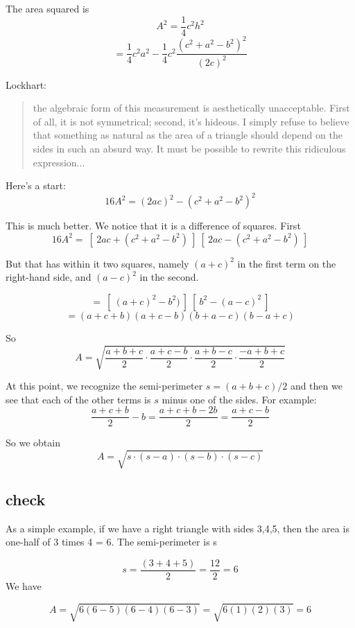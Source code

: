 \documentclass[11pt, oneside]{article}
\begin{document}
The area squared is
\[ A^2 = \frac{1}{4}c^2 h^2 \]
\[ = \frac{1}{4} c^2 a^2 - \frac{1}{4} c^2 \frac{(c^2 + a^2-b^2)^2}{(2c)^2}  \]

Lockhart:

\begin{quote}
the algebraic form of this measurement is aesthetically unacceptable. First of all, it is not symmetrical; second, it's hideous. I simply refuse to believe that something as natural as the area of a triangle should depend on the sides in such an absurd way. It must be possible to rewrite this ridiculous expression...
\end{quote}

Here's a start:
\[ 16A^2 = (2ac)^2 - (c^2 + a^2-b^2)^2 \]

This is much better.  We notice that it is a difference of squares.  First
\[ 16A^2 = \ [ \ 2ac + (c^2 + a^2-b^2) \ ] \ [ \ 2ac - (c^2 + a^2-b^2) \ ]  \]

But that has within it two squares, namely $(a + c)^2$ in the first term on the right-hand side, and $(a - c)^2$ in the second.

\[ = \ [ \ (a + c)^2 -b^2) \ ] \ [ \ b^2 - (a - c)^2 \ ]  \]
\[ =  (a + c + b)(a + c - b)(b + a - c)(b - a + c) \]

So
\[ A = \sqrt{\frac{a + b + c}{2}  \cdot \frac{a + c - b}{2}  \cdot \frac{a + b - c}{2}  \cdot \frac{-a + b + c}{2} } \]

At this point, we recognize the semi-perimeter $s = (a + b + c)/2$ and then we see that each of the other terms is $s$ minus one of the sides.  For example:
\[ \frac{a + c + b}{2} - b = \frac{a + c + b - 2b}{2} = \frac{a + c - b}{2} \]

So we obtain
\[ A = \sqrt{s \cdot (s - a) \cdot (s - b) \cdot (s - c) } \]
\subsection*{check}
As a simple example, if we have a right triangle with sides 3,4,5, then the area is one-half of 3 times 4 = 6.  The semi-perimeter is s

\[ s = \frac{(3 + 4 + 5)}{2} = \frac{12}{2} = 6 \]
We have

\[ A =  \sqrt { 6 (6-5) (6-4) (6-3) } =  \sqrt { 6 (1) (2) (3) } = 6 \]
\end{document}
